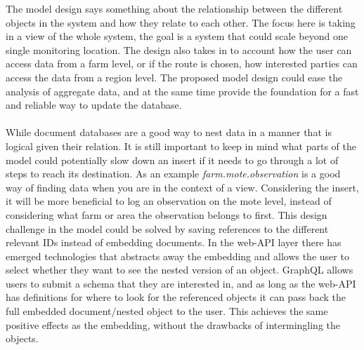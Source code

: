 \documentclass[]{uiophd}
\begin{document}
The model design says something about the relationship between the different objects in the system and how they relate to each other. The focus here is taking in a view of the whole system, the goal is a system that could scale beyond one single monitoring location. The design also takes in to account how the user can access data from a farm level, or if the route is chosen, how interested parties can access the data from a region level. The proposed model design could ease the analysis of aggregate data, and at the same time provide the foundation for a fast and reliable way to update the database.
\\\\
While document databases are a good way to nest data in a manner that is logical given their relation. It is still important to keep in  mind what parts of the model could potentially slow down an insert if it needs to go through a lot of steps to reach its destination. As an example \textit{farm.mote.observation} is a good way of finding data when you are in the context of a view. Considering the insert, it will be more beneficial to log an observation on the mote level, instead of considering what farm or area the observation belongs to first. This design challenge in the model could be solved by saving references to the different relevant IDs instead of embedding documents. In the web-API layer there has emerged technologies that abstracts away the embedding and allows the user to select whether they want to see the nested version of an object. GraphQL allows users to submit a schema that they are interested in, and as long as the web-API has definitions for where to look for the referenced objects it can pass back the full embedded document/nested object to the user. This achieves the same positive effects as the embedding, without the drawbacks of intermingling the objects.
\end{document}
